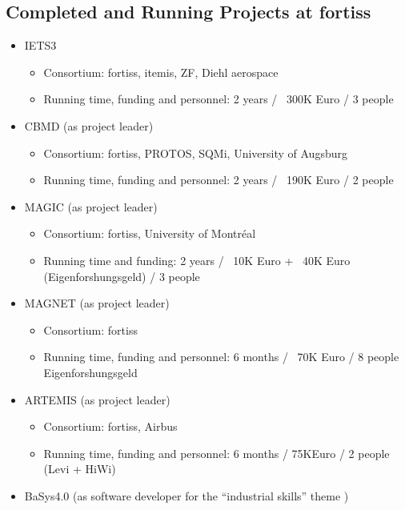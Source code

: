 \documentclass{scrartcl}
\begin{document}
\begin{appendices}
\section{Completed and Running Projects at fortiss}
\label{app:projects}

\begin{itemize}
  \item IETS3
  \begin{itemize}
    \item Consortium: fortiss, itemis, ZF, Diehl aerospace
    \item Running time, funding and personnel: 2 years / ~300K Euro / 3 people
  \end{itemize}
\end{itemize}

\begin{itemize}
  \item CBMD (as project leader)
  \begin{itemize}
    \item Consortium: fortiss, PROTOS, SQMi, University of Augsburg
    \item Running time, funding and personnel: 2 years / ~190K Euro / 2 people
  \end{itemize} 
  \item MAGIC (as project leader)
  \begin{itemize}
    \item Consortium: fortiss, University of Montréal
    \item Running time and funding: 2 years / ~10K Euro + ~40K Euro
    (Eigenforshungsgeld) / 3 people
  \end{itemize} 
  \item MAGNET (as project leader)
  \begin{itemize}
    \item Consortium: fortiss
    \item Running time, funding and personnel: 6 months / ~70K Euro / 8 people
    Eigenforshungsgeld
  \end{itemize}
  \item ARTEMIS (as project leader)
  \begin{itemize}
    \item Consortium: fortiss, Airbus
    \item Running time, funding and personnel: 6 months / 75KEuro / 2 people
    (Levi + HiWi)
  \end{itemize} 
  \item BaSys4.0 (as software developer for the ``industrial skills'' theme )
\end{itemize}


\end{appendices}
\end{document}
